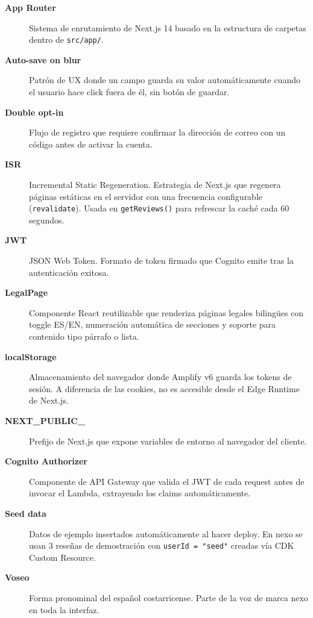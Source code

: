 \documentclass[12pt,a4paper]{article}
\begin{document}
\begin{description}
  \item[\textbf{App Router}] Sistema de enrutamiento de Next.js 14 basado en la
    estructura de carpetas dentro de \texttt{src/app/}.
  \item[\textbf{Auto-save on blur}] Patrón de UX donde un campo guarda su valor
    automáticamente cuando el usuario hace click fuera de él, sin botón de guardar.
  \item[\textbf{Double opt-in}] Flujo de registro que requiere confirmar la dirección
    de correo con un código antes de activar la cuenta.
  \item[\textbf{ISR}] Incremental Static Regeneration. Estrategia de Next.js que
    regenera páginas estáticas en el servidor con una frecuencia configurable
    (\texttt{revalidate}). Usada en \texttt{getReviews()} para refrescar la caché
    cada 60 segundos.
  \item[\textbf{JWT}] JSON Web Token. Formato de token firmado que Cognito emite
    tras la autenticación exitosa.
  \item[\textbf{LegalPage}] Componente React reutilizable que renderiza páginas
    legales bilingües con toggle ES/EN, numeración automática de secciones y
    soporte para contenido tipo párrafo o lista.
  \item[\textbf{localStorage}] Almacenamiento del navegador donde Amplify v6 guarda
    los tokens de sesión. A diferencia de las cookies, no es accesible desde el
    Edge Runtime de Next.js.
  \item[\textbf{NEXT\_PUBLIC\_}] Prefijo de Next.js que expone variables de entorno
    al navegador del cliente.
  \item[\textbf{Cognito Authorizer}] Componente de API Gateway que valida el JWT
    de cada request antes de invocar el Lambda, extrayendo los claims automáticamente.
  \item[\textbf{Seed data}] Datos de ejemplo insertados automáticamente al hacer
    deploy. En nexo se usan 3 reseñas de demostración con \texttt{userId = "seed"}
    creadas vía CDK Custom Resource.
  \item[\textbf{Voseo}] Forma pronominal del español costarricense. Parte de la
    voz de marca nexo en toda la interfaz.
\end{description}

\vfill
\begin{center}
\end{center}
\end{document}
